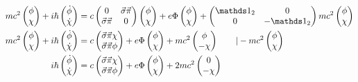 \begin{align}
%
 mc^2   \begin{pmatrix}  \phi\\\chi \end{pmatrix} +  i\hbar\begin{pmatrix}  \dot \phi\\ \dot \chi \end{pmatrix} &= c
   \begin{pmatrix}
     0&\vec \sigma\vec\pi\\
     \vec \sigma\vec\pi&0
   \end{pmatrix}\begin{pmatrix}  \phi\\\chi \end{pmatrix} 
 + e\Phi\begin{pmatrix}  \phi\\\chi \end{pmatrix}     +
 \begin{pmatrix}
   \mathds 1_2&0\\
   0&-\mathds 1_2
 \end{pmatrix}
mc^2  \begin{pmatrix}  \phi\\\chi \end{pmatrix}  \notag\\
%
 mc^2   \begin{pmatrix}  \phi\\\chi \end{pmatrix} +  i\hbar\begin{pmatrix}  \dot \phi\\ \dot \chi \end{pmatrix} &= c
 \begin{pmatrix} \vec \sigma\vec\pi \chi\\\vec \sigma\vec\pi\phi \end{pmatrix} 
 + e\Phi\begin{pmatrix}  \phi\\\chi \end{pmatrix}     +
mc^2  \begin{pmatrix}  \phi\\-\chi \end{pmatrix} \qquad |-mc^2   \begin{pmatrix}  \phi\\\chi \end{pmatrix} \notag\\
%
 i\hbar\begin{pmatrix}  \dot \phi\\ \dot \chi \end{pmatrix} &= c
 \begin{pmatrix} \vec \sigma\vec\pi \chi\\\vec \sigma\vec\pi\phi \end{pmatrix} 
 + e\Phi\begin{pmatrix}  \phi\\\chi \end{pmatrix}     +
2mc^2  \begin{pmatrix}  0\\-\chi \end{pmatrix} 
\end{align}

